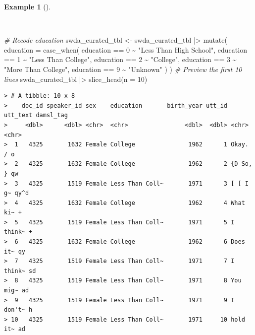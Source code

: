 \documentclass[
  letterpaper,
  DIV=11,
  numbers=noendperiod]{scrreport}
\newenvironment{Shaded}{\begin{snugshade}}{\end{snugshade}}
\newcommand{\AttributeTok}[1]{\textcolor[rgb]{0.00,0.00,0.00}{#1}}
\newcommand{\CommentTok}[1]{\textcolor[rgb]{0.00,0.00,0.00}{\textit{#1}}}
\newcommand{\DecValTok}[1]{\textcolor[rgb]{0.00,0.00,0.00}{#1}}
\newcommand{\FunctionTok}[1]{\textcolor[rgb]{0.00,0.00,0.00}{#1}}
\newcommand{\NormalTok}[1]{\textcolor[rgb]{0.00,0.00,0.00}{#1}}
\newcommand{\OtherTok}[1]{\textcolor[rgb]{0.00,0.00,0.00}{#1}}
\newcommand{\SpecialCharTok}[1]{\textcolor[rgb]{0.00,0.00,0.00}{#1}}
\newcommand{\StringTok}[1]{\textcolor[rgb]{0.00,0.00,0.00}{#1}}
\theoremstyle{definition}
\newtheorem{example}{Example}[chapter]
\theoremstyle{remark}
\begin{document}
\begin{example}[]\protect\hypertarget{exm-td-swda-recoding-education}{}\label{exm-td-swda-recoding-education}

~

\begin{Shaded}
\begin{Highlighting}[]
\CommentTok{\# Recode education}
\NormalTok{swda\_curated\_tbl }\OtherTok{\textless{}{-}} 
\NormalTok{  swda\_curated\_tbl }\SpecialCharTok{|\textgreater{}}
  \FunctionTok{mutate}\NormalTok{(}
    \AttributeTok{education =} \FunctionTok{case\_when}\NormalTok{(}
\NormalTok{      education }\SpecialCharTok{==} \DecValTok{0} \SpecialCharTok{\textasciitilde{}} \StringTok{"Less Than High School"}\NormalTok{,}
\NormalTok{      education }\SpecialCharTok{==} \DecValTok{1} \SpecialCharTok{\textasciitilde{}} \StringTok{"Less Than College"}\NormalTok{,}
\NormalTok{      education }\SpecialCharTok{==} \DecValTok{2} \SpecialCharTok{\textasciitilde{}} \StringTok{"College"}\NormalTok{,}
\NormalTok{      education }\SpecialCharTok{==} \DecValTok{3} \SpecialCharTok{\textasciitilde{}} \StringTok{"More Than College"}\NormalTok{,}
\NormalTok{      education }\SpecialCharTok{==} \DecValTok{9} \SpecialCharTok{\textasciitilde{}} \StringTok{"Unknown"}
\NormalTok{    )}
\NormalTok{  )}
\CommentTok{\# Preview the first 10 lines}
\NormalTok{swda\_curated\_tbl }\SpecialCharTok{|\textgreater{}}
  \FunctionTok{slice\_head}\NormalTok{(}\AttributeTok{n =} \DecValTok{10}\NormalTok{)}
\end{Highlighting}
\end{Shaded}

\begin{verbatim}
> # A tibble: 10 x 8
>    doc_id speaker_id sex    education       birth_year utt_id utt_text damsl_tag
>     <dbl>      <dbl> <chr>  <chr>                <dbl>  <dbl> <chr>    <chr>    
>  1   4325       1632 Female College               1962      1 Okay.  / o        
>  2   4325       1632 Female College               1962      2 {D So, } qw       
>  3   4325       1519 Female Less Than Coll~       1971      3 [ [ I g~ qy^d     
>  4   4325       1632 Female College               1962      4 What ki~ +        
>  5   4325       1519 Female Less Than Coll~       1971      5 I think~ +        
>  6   4325       1632 Female College               1962      6 Does it~ qy       
>  7   4325       1519 Female Less Than Coll~       1971      7 I think~ sd       
>  8   4325       1519 Female Less Than Coll~       1971      8 You mig~ ad       
>  9   4325       1519 Female Less Than Coll~       1971      9 I don't~ h        
> 10   4325       1519 Female Less Than Coll~       1971     10 hold it~ ad
\end{verbatim}

\end{example}
\end{document}
